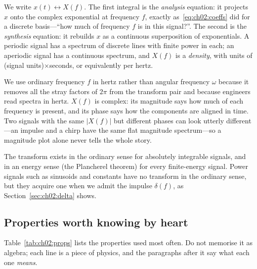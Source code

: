 We write $x(t)\leftrightarrow X(f)$. The first integral is the \emph{analysis} equation: it projects
$x$ onto the complex exponential at frequency $f$, exactly as~\eqref{eq:ch02:coeffs} did for a
discrete basis---``how much of frequency $f$ is in this signal?''. The second is the \emph{synthesis}
equation: it rebuilds $x$ as a continuous superposition of exponentials. A periodic signal has a
spectrum of discrete lines with finite power in each; an aperiodic signal has a continuous spectrum,
and $X(f)$ is a \emph{density}, with units of (signal units)$\times$seconds, or equivalently per hertz.

We use ordinary frequency $f$ in hertz rather than angular frequency $\omega$ because it
removes all the stray factors of $2\pi$ from the transform pair and because engineers read
spectra in hertz. $X(f)$ is complex: its magnitude says how much of each frequency is present,
and its phase says how the components are aligned in time. Two signals with the same
$|X(f)|$ but different phases can look utterly different---an impulse and a chirp have the same
flat magnitude spectrum---so a magnitude plot alone never tells the whole story.

The transform exists in the ordinary sense for absolutely integrable signals, and in an energy
sense (the Plancherel theorem) for every finite-energy signal. Power signals such as sinusoids
and constants have no transform in the ordinary sense, but they acquire one when we admit the
impulse $\delta(f)$, as Section~\ref{sec:ch02:delta} shows.

\subsection{Properties worth knowing by heart}

Table~\ref{tab:ch02:props} lists the properties used most often. Do not memorise it as algebra;
each line is a piece of physics, and the paragraphs after it say what each one \emph{means}.

